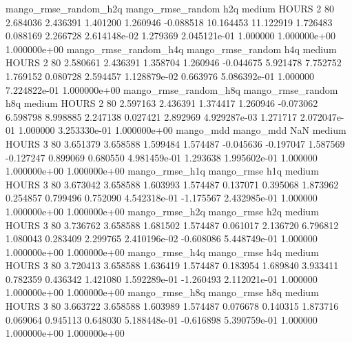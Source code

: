 mango_rmse_random_h2q mango_rmse_random                  h2q     medium    HOURS                 2 80  2.684036       2.436391 1.401200       1.260946   -0.088518     10.164453     11.122919     1.726483       0.088169  2.266728 2.614148e-02     1.279369   2.045121e-01            1.000000    1.000000e+00        1.000000e+00
mango_rmse_random_h4q mango_rmse_random                  h4q     medium    HOURS                 2 80  2.580661       2.436391 1.358704       1.260946   -0.044675      5.921478      7.752752     1.769152       0.080728  2.594457 1.128879e-02     0.663976   5.086392e-01            1.000000    7.224822e-01        1.000000e+00
mango_rmse_random_h8q mango_rmse_random                  h8q     medium    HOURS                 2 80  2.597163       2.436391 1.374417       1.260946   -0.073062      6.598798      8.998885     2.247138       0.027421  2.892969 4.929287e-03     1.271717   2.072047e-01            1.000000    3.253330e-01        1.000000e+00
            mango_mdd         mango_mdd                  NaN     medium    HOURS                 3 80  3.651379       3.658588 1.599484       1.574487   -0.045636     -0.197047      1.587569    -0.127247       0.899069  0.680550 4.981459e-01     1.293638   1.995602e-01            1.000000    1.000000e+00        1.000000e+00
       mango_rmse_h1q        mango_rmse                  h1q     medium    HOURS                 3 80  3.673042       3.658588 1.603993       1.574487    0.137071      0.395068      1.873962     0.254857       0.799496  0.752090 4.542318e-01    -1.175567   2.432985e-01            1.000000    1.000000e+00        1.000000e+00
       mango_rmse_h2q        mango_rmse                  h2q     medium    HOURS                 3 80  3.736762       3.658588 1.681502       1.574487    0.061017      2.136720      6.796812     1.080043       0.283409  2.299765 2.410196e-02    -0.608086   5.448749e-01            1.000000    1.000000e+00        1.000000e+00
       mango_rmse_h4q        mango_rmse                  h4q     medium    HOURS                 3 80  3.720413       3.658588 1.636419       1.574487    0.183954      1.689840      3.933411     0.782359       0.436342  1.421080 1.592289e-01    -1.260493   2.112021e-01            1.000000    1.000000e+00        1.000000e+00
       mango_rmse_h8q        mango_rmse                  h8q     medium    HOURS                 3 80  3.663722       3.658588 1.603989       1.574487    0.076678      0.140315      1.873716     0.069064       0.945113  0.648030 5.188448e-01    -0.616898   5.390759e-01            1.000000    1.000000e+00        1.000000e+00

